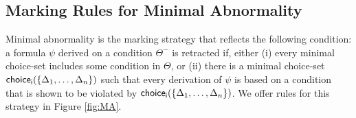 \documentclass[]{article}
\newcommand{\TurnOne}[2]
    { {#1}\vdash_{\textbf{\sf 1}}  {#2}}
\newcommand{\TurnTwo}[2]
    { {#1}\vdash_{\textbf{\sf 2}}  {#2}}
\newcommand{\TurnThree}[2]
    { {#1}\vdash_{\textbf{\sf 3}}  {#2}}
\newcommand{\TurnFour}[2]
    { {#1}\vdash_{\textbf{\sf 4}}  {#2}}
\newcommand{\TurnFive}[2]
    { {#1}\vdash_{\textbf{\sf 5}}  {#2}}
\newcommand{\TurnSix}[2]
    { {#1}\vdash_{\textbf{\sf 6}}  {#2}}
\newcommand{\TurnMarkedSevenREL}[2]
    { {#1}\vdash_{\textbf{\sf 7\XBox R}}  {#2}}
\newcommand{\TurnMarkedEightREL}[2]
    { {#1}\vdash_{\textbf{\sf 8\XBox R}}  {#2}}
\begin{document}
%
%
%
%

\subsection{Marking Rules for Minimal Abnormality}\label{sec:ma}
%
%
Minimal abnormality is the marking strategy that reflects the following condition: a formula $\psi$ derived on a condition $\Theta^-$ is retracted if, either (i) every minimal choice-set includes some condition in $\Theta$, or (ii) there is a minimal choice-set ${\sf choice_{i}}(\{\Delta_{1},\ldots, \Delta_{n}\})$ such that every derivation of $\psi$ is based on a condition that is shown to be violated by ${\sf choice_{i}}(\{\Delta_{1},\ldots, \Delta_{n}\})$. We offer rules for this strategy in Figure \ref{fig:MA}.
\end{document}
